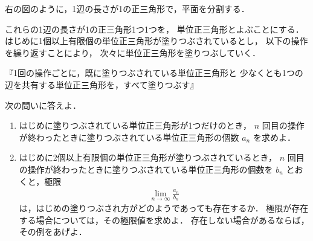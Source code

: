 \documentclass[../../main.tex]{subfiles}
\begin{document}
右の図のように，1辺の長さが1の正三角形で，平面を分割する．

これらの1辺の長さが1の正三角形1つ1つを，
単位正三角形とよぶことにする．
はじめに1個以上有限個の単位正三角形が塗りつぶされているとし，
以下の操作を繰り返すことにより，
次々に単位正三角形を塗りつぶしていく．

『1回の操作ごとに，既に塗りつぶされている単位正三角形と
少なくとも1つの辺を共有する単位正三角形を，すべて塗りつぶす』

次の問いに答えよ．

\begin{figure}[htbp]
  \centering
\end{figure}

\begin{enumerate}
  \item はじめに塗りつぶされている単位正三角形が1つだけのとき，
    $n$ 回目の操作が終わったときに塗りつぶされている単位正三角形の個数 $a_n$ を求めよ．

  \item はじめに2個以上有限個の単位正三角形が塗りつぶされているとき，
    $n$ 回目の操作が終わったときに塗りつぶされている単位正三角形の個数を $b_n$ とおくと，極限
    \begin{align*}
      \lim_{n\to\infty}\frac{a_n}{b_n}
    \end{align*}
    は，はじめの塗りつぶされ方がどのようであっても存在するか．
    極限が存在する場合については，その極限値を求めよ．
    存在しない場合があるならば，その例をあげよ．
\end{enumerate}
\end{document}
